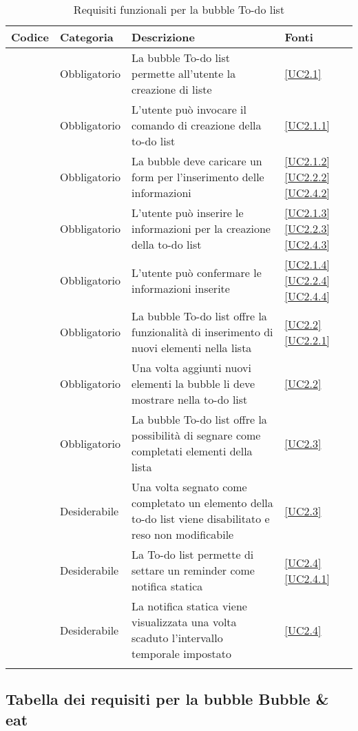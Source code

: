 \begin{longtable}{|P{1.5cm}|P{2.5cm}|P{6.5cm}|P{2.5cm}|}
	\hline \textbf{Codice} & \textbf{Categoria} & \textbf{Descrizione} & \textbf{Fonti} \\
	\hline \RequisitoObF\label{L17} & Obbligatorio & La bubble To-do list permette all'utente la creazione di liste & \ref{UC2.1} \\
	\hline \RequisitoObF\label{L71} & Obbligatorio & L'utente può invocare il comando di creazione della to-do list & \ref{UC2.1.1} \\
	\hline \RequisitoObF\label{L95} & Obbligatorio & La bubble deve caricare un form per l'inserimento delle informazioni & \ref{UC2.1.2} \ref{UC2.2.2}  \ref{UC2.4.2} \\
	\hline \RequisitoObF\label{L72} & Obbligatorio & L'utente può inserire le informazioni per la creazione della to-do list & \ref{UC2.1.3} \ref{UC2.2.3} \ref{UC2.4.3}\\
	\hline \RequisitoObF\label{L73} & Obbligatorio & L'utente può confermare le informazioni inserite & \ref{UC2.1.4} \ref{UC2.2.4} \ref{UC2.4.4}\\
	\hline \RequisitoObF\label{L18} & Obbligatorio & La bubble To-do list offre la funzionalità di inserimento di nuovi elementi nella lista & \ref{UC2.2} \ref{UC2.2.1} \\
	\hline \RequisitoObF\label{L74} & Obbligatorio & Una volta aggiunti nuovi elementi la bubble li deve mostrare nella to-do list & \ref{UC2.2} \\
	\hline \RequisitoObF\label{L19} & Obbligatorio & La bubble To-do list offre la possibilità di segnare come completati elementi della lista & \ref{UC2.3} \\
	\hline \RequisitoDF\label{L75} & Desiderabile & Una volta segnato come completato un elemento della to-do list viene disabilitato e reso non modificabile & \ref{UC2.3} \\
	\hline \RequisitoDF\label{L20} & Desiderabile & La To-do list permette di settare un reminder come notifica statica & \ref{UC2.4} \ref{UC2.4.1}\\
	\hline \RequisitoDF\label{L76} & Desiderabile & La notifica statica viene visualizzata una volta scaduto l'intervallo temporale impostato & \ref{UC2.4} \\
	\hline
	\caption{Requisiti funzionali per la bubble To-do list}
\end{longtable}

\subsection{Tabella dei requisiti per la bubble Bubble \& eat}

